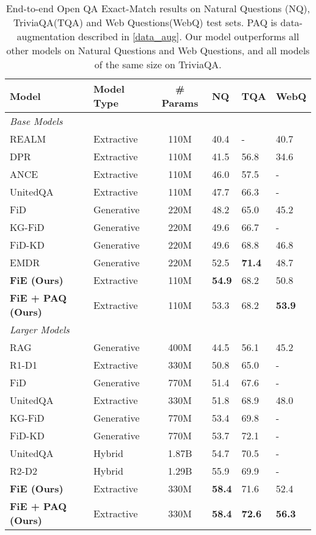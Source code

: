 \documentclass[11pt]{article}
\begin{document}
 \begin{table*}[h!]
\begin{center}
\begin{tabular}{llclll}
\toprule
\textbf{Model} & \textbf{Model Type} &  \textbf{\# Params} & \textbf{NQ}  & \textbf{TQA}  & \textbf{WebQ}\\ 
\toprule 
\multicolumn{6}{l}{\textit{Base Models}} \\
REALM \cite{realm} & Extractive & 110M & 40.4  & - & 40.7 \\
DPR \cite{dpr} & Extractive & 110M & 41.5  &  56.8 & 34.6 \\
ANCE \cite{ance} & Extractive & 110M & 46.0 & 57.5 & - \\
UnitedQA \cite{cheng-etal-2021-unitedqa} & Extractive & 110M & 47.7 & 66.3 & - \\
FiD \cite{fid} & Generative & 220M & 48.2 & 65.0 & 45.2  \\
KG-FiD \cite{kgfid} & Generative & 220M & 49.6 & 66.7 & - \\
FiD-KD \cite{fidkd} & Generative & 220M & 49.6 & 68.8 & 46.8 \\
EMDR \cite{emdr2} & Generative & 220M & 52.5 & \textbf{71.4} & 48.7 \\
\midrule 
\textbf{FiE (Ours)} & Extractive & 110M & \textbf{54.9} & 68.2 & 50.8 \\
\textbf{FiE + PAQ (Ours)} & Extractive & 110M & 53.3 & 68.2 & \textbf{53.9} \\
\midrule 
\multicolumn{6}{l}{\textit{Larger Models}} \\
RAG \cite{rag} & Generative & 400M & 44.5 & 56.1 & 45.2 \\
R1-D1 \cite{r2d2} & Extractive & 330M & 50.8 & 65.0 & - \\
FiD \cite{fid} & Generative & 770M & 51.4 & 67.6 & - \\
UnitedQA \cite{cheng-etal-2021-unitedqa} & Extractive & 330M & 51.8 & 68.9 & 48.0
\\
KG-FiD \cite{kgfid} & Generative & 770M & 53.4 & 69.8 & - \\
FiD-KD \cite{fidkd} & Generative & 770M & 53.7 & 72.1 & - \\
UnitedQA \cite{cheng-etal-2021-unitedqa} & Hybrid & 1.87B& 54.7 & 70.5 & - \\
R2-D2 \cite{r2d2} & Hybrid & 1.29B& 55.9 & 69.9 & - \\
\midrule 
\textbf{FiE (Ours)} & Extractive & 330M & \textbf{58.4} & 71.6 & 52.4 \\
\textbf{FiE + PAQ (Ours)} & Extractive & 330M & \textbf{58.4} & \textbf{72.6} & \textbf{56.3} \\

\bottomrule
\end{tabular}
\end{center}
\caption{End-to-end Open QA Exact-Match results on Natural Questions (NQ), TriviaQA(TQA) and Web Questions(WebQ) test sets. PAQ is data-augmentation described in \cref{data_aug}. Our model outperforms all other models on Natural Questions and Web Questions, and all models of the same size on TriviaQA.}
\label{tab_main_result}
\end{table*}
\end{document}
